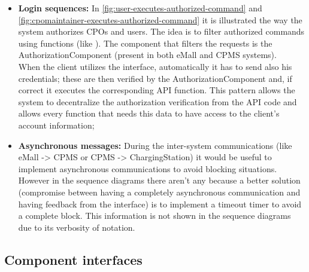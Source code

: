 \begin{itemize}
    \item \textbf{Login sequences:} In \autoref{fig:user-executes-authorized-command} and \autoref{fig:cpomaintainer-executes-authorized-command} it is illustrated the way the system authorizes \acp{CPO} and users. The idea is to filter authorized commands using functions (like \cite{ref:command-pattern}). The component that filters the requests is the AuthorizationComponent (present in both \ac{eMall} and \ac{CPMS} systems).\\
          When the client utilizes the interface, automatically it has to send also his credentials; these are then verified by the AuthorizationComponent and, if correct it executes the corresponding API function. This pattern allows the system to decentralize the authorization verification from the API code and allows every function that needs this data to have access to the client's account information;
    \item \textbf{Asynchronous messages:} During the inter-system communications (like \ac{eMall} -> \ac{CPMS} or \ac{CPMS} -> ChargingStation) it would be useful to implement asynchronous communications to avoid blocking situations. However in the sequence diagrams there aren't any because a better solution (compromise between having a completely asynchronous communication and having feedback from the interface) is to implement a timeout timer to avoid a complete block. This information is not shown in the sequence diagrams due to its verbosity of notation.

\end{itemize}
\subsection{Component interfaces}


